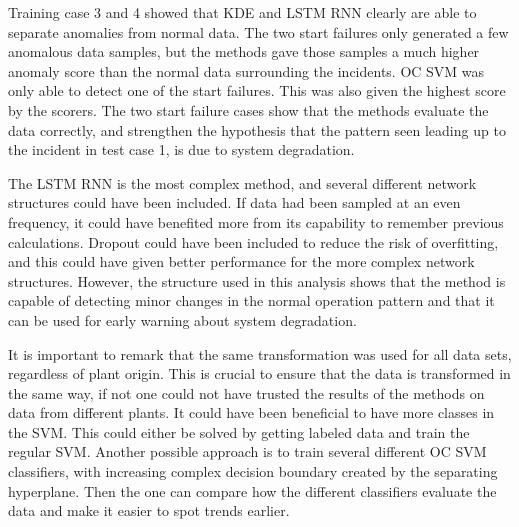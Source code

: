     
    Training case 3 and 4 showed that KDE and LSTM RNN clearly are able to separate anomalies from normal data. The two start failures only generated a few anomalous data samples, but the methods gave those samples a much higher anomaly score than the normal data surrounding the incidents. OC SVM was only able to detect one of the start failures. This was also given the highest score by the scorers. The two start failure cases show that the methods evaluate the data correctly, and strengthen the hypothesis that the pattern seen leading up to the incident in test case 1, is due to system degradation. 
    
    The LSTM RNN is the most complex method, and several different network structures could have been included. If data had been sampled at an even frequency, it could have benefited more from its capability to remember previous calculations. Dropout could have been included to reduce the risk of overfitting, and this could have given better performance for the more complex network structures. However, the structure used in this analysis shows that the method is capable of detecting minor changes in the normal operation pattern and that it can be used for early warning about system degradation.  
    
    It is important to remark that the same transformation was used for all data sets, regardless of plant origin. This is crucial to ensure that the data is transformed in the same way, if not one could not have trusted the results of the methods on data from different plants.  It could have been beneficial to have more classes in the SVM. This could either be solved by getting labeled data and train the regular SVM. Another possible approach is to train several different OC SVM classifiers, with increasing complex decision boundary created by the separating hyperplane. Then the one can compare how the different classifiers evaluate the data and make it easier to spot trends earlier.

